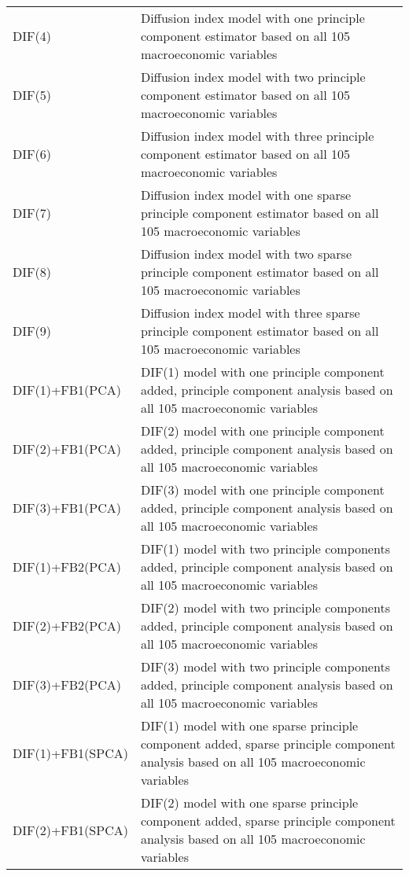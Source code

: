 \begin{table}[h]
{\begin{tabular}{ll}
DIF(4)                    & Diffusion index model with one principle component estimator based on all 105 macroeconomic variables \\
DIF(5)                    & Diffusion index model with two principle component estimator based on all 105 macroeconomic variables \\
DIF(6)                    & Diffusion index model with three principle component estimator based on all 105 macroeconomic variables \\
DIF(7)                    & Diffusion index model with one sparse principle component estimator based on all 105 macroeconomic variables \\
DIF(8)                    & Diffusion index model with two sparse principle component estimator based on all 105 macroeconomic variables \\
DIF(9)                    & Diffusion index model with three sparse principle component estimator based on all 105 macroeconomic variables \\
DIF(1)+FB1(PCA)           & DIF(1) model with one principle component added, principle component analysis based on all 105 macroeconomic variables \\
DIF(2)+FB1(PCA)           & DIF(2) model with one principle component added, principle component analysis based on all 105 macroeconomic variables \\
DIF(3)+FB1(PCA)           & DIF(3) model with one principle component added, principle component analysis based on all 105 macroeconomic variables \\
DIF(1)+FB2(PCA)           & DIF(1) model with two principle components added, principle component analysis based on all 105 macroeconomic variables \\
DIF(2)+FB2(PCA)           & DIF(2) model with two principle components added, principle component analysis based on all 105 macroeconomic variables \\
DIF(3)+FB2(PCA)           & DIF(3) model with two principle components added, principle component analysis based on all 105 macroeconomic variables \\
DIF(1)+FB1(SPCA)          & DIF(1) model with one sparse principle component added, sparse principle component analysis based on all 105 macroeconomic variables \\
DIF(2)+FB1(SPCA)          & DIF(2) model with one sparse principle component added, sparse principle component analysis based on all 105 macroeconomic variables \\

\end{tabular}}
\end{table}
